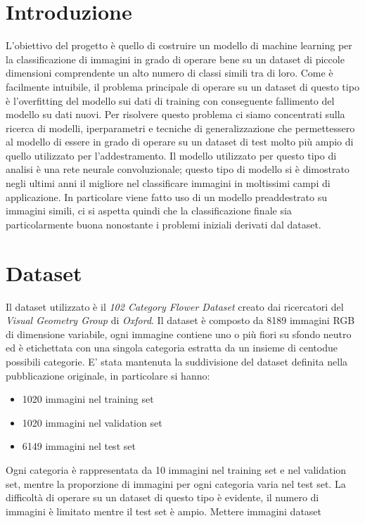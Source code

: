 \section{Introduzione}
L'obiettivo del progetto è quello di costruire un modello di machine learning per la classificazione di immagini in grado di operare bene su un dataset di piccole dimensioni comprendente un alto numero di classi simili tra di loro.
Come è facilmente intuibile, il problema principale di operare su un dataset di questo tipo è l'overfitting del modello sui dati di training con conseguente fallimento del modello su dati nuovi. Per risolvere questo problema ci siamo concentrati sulla ricerca di modelli, iperparametri e tecniche di generalizzazione che permettessero al modello di essere in grado di operare su un dataset di test molto più ampio di quello utilizzato per l'addestramento.
Il modello utilizzato per questo tipo di analisi è una rete neurale convoluzionale; questo tipo di modello si è dimostrato negli ultimi anni il migliore nel classificare immagini in moltissimi campi di applicazione.
In particolare viene fatto uso di un modello preaddestrato su immagini simili, ci si aspetta quindi che la classificazione finale sia particolarmente buona nonostante i problemi iniziali derivati dal dataset.

\section{Dataset}
Il dataset utilizzato è il \textit{102 Category Flower Dataset} \cite{Nilsback08} creato dai ricercatori del \textit{Visual Geometry Group} di \textit{Oxford}. Il dataset è composto da 8189 immagini RGB di dimensione variabile, ogni immagine contiene uno o più fiori su sfondo neutro ed è etichettata con una singola categoria estratta da un insieme di centodue possibili categorie. 
E' stata mantenuta la suddivisione del dataset definita nella pubblicazione originale, in particolare si hanno:
\begin{itemize}
\item 1020 immagini nel training set
\item 1020 immagini nel validation set
\item 6149 immagini nel test set
\end{itemize}
Ogni categoria è rappresentata da 10 immagini nel training set e nel validation set, mentre la proporzione di immagini per ogni categoria varia nel test set.
La difficoltà di operare su un dataset di questo tipo è evidente, il numero di immagini è limitato mentre il test set è ampio.
Mettere immagini dataset

